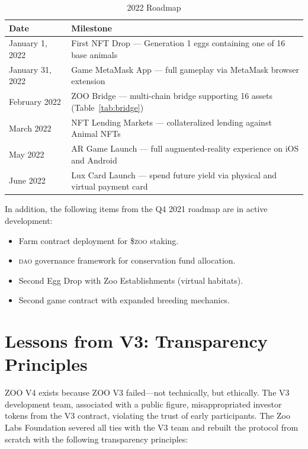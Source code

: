 \documentclass[11pt,letterpaper]{article}
\newcommand{\DAO}{\textsc{dao}}
\newcommand{\ZOO}{\$\textsc{zoo}}
\begin{document}
\begin{table}[ht]
\centering
\caption{2022 Roadmap}
\label{tab:roadmap}
\begin{tabular}{lp{9cm}}
\toprule
Date & Milestone \\
\midrule
January 1, 2022  & First NFT Drop --- Generation 1 eggs containing one of 16 base
                    animals \\
January 31, 2022 & Game MetaMask App --- full gameplay via MetaMask browser extension \\
February 2022    & ZOO Bridge --- multi-chain bridge supporting 16 assets
                    (Table~\ref{tab:bridge}) \\
March 2022       & NFT Lending Markets --- collateralized lending against Animal NFTs \\
May 2022         & AR Game Launch --- full augmented-reality experience on iOS and
                    Android \\
June 2022        & Lux Card Launch --- spend future yield via physical and virtual
                    payment card \\
\bottomrule
\end{tabular}
\end{table}

In addition, the following items from the Q4 2021 roadmap are in active development:

\begin{itemize}
    \item Farm contract deployment for \ZOO{} staking.
    \item \DAO{} governance framework for conservation fund allocation.
    \item Second Egg Drop with Zoo Establishments (virtual habitats).
    \item Second game contract with expanded breeding mechanics.
\end{itemize}

\section{Lessons from V3: Transparency Principles}
\label{sec:v3}

ZOO V4 exists because ZOO V3 failed---not technically, but ethically.  The V3 development
team, associated with a public figure, misappropriated investor tokens from the V3
contract, violating the trust of early participants.  The Zoo Labs Foundation severed all
ties with the V3 team and rebuilt the protocol from scratch with the following transparency
principles:
\end{document}
